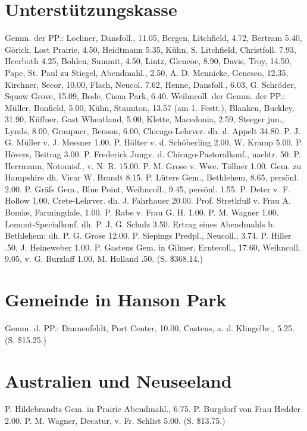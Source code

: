 \section{Unterstützungskasse}

Gemm. der PP.: Lochner, Dansfoll., 11.05, Bergen, Litchfield, 4.72, Bertram 5.40, Görick, Lost Prairie, 4.50, Heidtmann 5.35, Kühn, S. Litchfield, Christfoll. 7.93, Heerboth 4.25, Bohlen, Summit, 4.50, Lintz, Glencoe, 8.90, Davis, Troy, 14.50, Pape, St. Paul zu Stiegel, Abendmahl., 2.50, A. D. Mennicke, Geneseo, 12.35, Kirchner, Secor, 10.00, Flach, Neucol. 7.62, Henne, Dansfoll., 6.03, G. Schröder, Squaw Grove, 15.09, Bode, Cisna Park, 6.40. Weihncoll. der Gemm. der PP.: Müller, Bonfield, 5.00, Kühn, Staunton, 13.57 (am 1. Festt.), Blanken, Buckley, 31.90, Küffner, Gast Wheatland, 5.00, Klette, Macedonia, 2.59, Steeger jun., Lynds, 8.00, Graupner, Benson, 6.00, Chicago-Lehrver. dh. d. Appelt 34.80. P. J. G. Müller v. J. Messner 1.00. P. Hölter v. d. Schöberling 2.00, W. Kramp 5.00. P. Hövers, Beitrag 3.00. P. Frederick Jungv. d. Chicago-Pastoralkonf., nachtr. 50. P. Herrmann, Notomisf., v. N. R. 15.00. P. M. Grose v. Wwe. Töllner 1.00. Gem. zu Hampshire dh. Vicar W. Brandt 8.15. P. Lüters Gem., Bethlehem, 8.65, persönl. 2.00. P. Gräfs Gem., Blue Point, Weihncoll., 9.45, persönl. 1.55. P. Deter v. F. Hollow 1.00. Crete-Lehrver. dh. J. Fahrhauer 20.00. Prof. Stretkfuß v. Frau A. Bomke, Farmingdale, 1.00. P. Rabe v. Frau G. H. 1.00. P. M. Wagner 1.00. Lemont-Specialkonf. dh. P. J. G. Schulz 3.50. Ertrag eines Abendmahls b. Bethlehem: dh. P. G. Grose 12.00. P. Siepings Predpl., Neucoll., 3.74. P. Hiller .50, J. Heineweber 1.00. P. Gastens Gem. in Gilmer, Erntecoll., 17.60, Weihncoll. 9.05, v. G. Burzlaff 1.00, M. Holland .50. (S. \$368.14.)

\section{Gemeinde in Hanson Park}

Gemm. d. PP.: Dannenfeldt, Port Center, 10.00, Castens, a. d. Klingelbr., 5.25. (S. \$15.25.)

\section{Australien und Neuseeland}

P. Hildebrandts Gem. in Prairie Abendmahl., 6.75. P. Burgdorf von Frau Hedder 2.00. P. M. Wagner, Decatur, v. Fr. Schlist 5.00. (S. \$13.75.)

